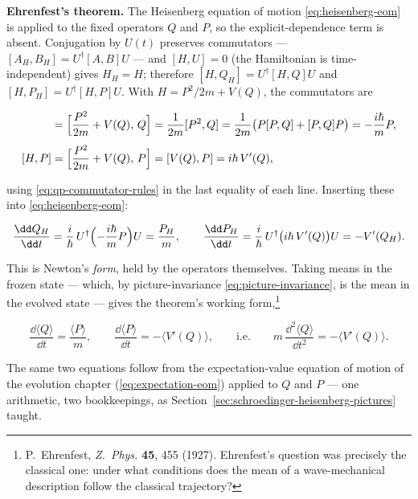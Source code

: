 \textbf{Ehrenfest's theorem.} The Heisenberg equation of motion \eqref{eq:heisenberg-eom} is applied to the fixed operators $Q$ and $P$, so the explicit-dependence term is absent. Conjugation by $U(t)$ preserves commutators --- $[A_H,B_H]=U^\dagger[A,B]U$ --- and $[H,U]=0$ (the Hamiltonian is time-independent) gives $H_H=H$; therefore $[H,Q_H]=U^\dagger[H,Q]U$ and $[H,P_H]=U^\dagger[H,P]U$. With $H=P^2/2m+V(Q)$, the commutators are
\begin{linenomath}
    \begin{align*}
        [H,Q] &= \Bigl[\frac{P^2}{2m}+V(Q),\,Q\Bigr]
               = \frac{1}{2m}[P^2,Q]
               = \frac{1}{2m}\bigl(P[P,Q]+[P,Q]P\bigr)
               = -\frac{i\hbar}{m}P,\\[4pt]
        [H,P] &= \Bigl[\frac{P^2}{2m}+V(Q),\,P\Bigr]
               = [V(Q),P]
               = i\hbar\,V'(Q),
    \end{align*}
\end{linenomath}
using \eqref{eq:qp-commutator-rules} in the last equality of each line. Inserting these into \eqref{eq:heisenberg-eom}:
\begin{linenomath}
    \begin{equation}
        \frac{\dd Q_H}{\dd t} = \frac{i}{\hbar}\,U^\dagger\Bigl(-\frac{i\hbar}{m}P\Bigr)U = \frac{P_H}{m},
        \qquad
        \frac{\dd P_H}{\dd t} = \frac{i}{\hbar}\,U^\dagger\bigl(i\hbar\,V'(Q)\bigr)U = -V'(Q_H).
    \end{equation}
\end{linenomath}
This is Newton's \emph{form}, held by the operators themselves. Taking means in the frozen state --- which, by picture-invariance \eqref{eq:picture-invariance}, is the mean in the evolved state --- gives the theorem's working form,\footnote{P.~Ehrenfest, \emph{Z.~Phys.} \textbf{45}, 455 (1927). Ehrenfest's question was precisely the classical one: under what conditions does the mean of a wave-mechanical description follow the classical trajectory?}
\begin{linenomath}
    \begin{equation}
        \frac{\dd\langle Q\rangle}{\dd t} = \frac{\langle P\rangle}{m},
        \qquad
        \frac{\dd\langle P\rangle}{\dd t} = -\bigl\langle V'(Q)\bigr\rangle,
        \qquad\text{i.e.}\qquad
        m\,\frac{\dd^2\langle Q\rangle}{\dd t^2} = -\bigl\langle V'(Q)\bigr\rangle.
        \label{eq:ehrenfest}
    \end{equation}
\end{linenomath}
The same two equations follow from the expectation-value equation of motion of the evolution chapter (\eqref{eq:expectation-eom}) applied to $Q$ and $P$ --- one arithmetic, two bookkeepings, as Section~\ref{sec:schroedinger-heisenberg-pictures} taught.

